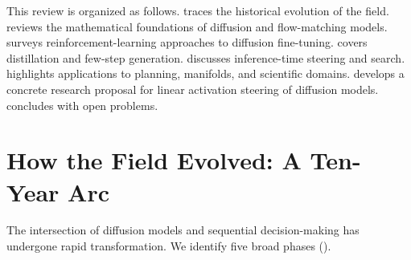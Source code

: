 \documentclass[11pt]{article}
\begin{document}
This review is organized as follows.
 traces the historical evolution of the field.
 reviews the mathematical foundations of diffusion and flow-matching models.
 surveys reinforcement-learning approaches to diffusion fine-tuning.
 covers distillation and few-step generation.
 discusses inference-time steering and search.
 highlights applications to planning, manifolds, and scientific domains.
 develops a concrete research proposal for linear activation steering of diffusion models.
 concludes with open problems.

\section{How the Field Evolved: A Ten-Year Arc}
\label{sec:evolution}

The intersection of diffusion models and sequential decision-making has undergone rapid transformation.
We identify five broad phases ().
\end{document}

